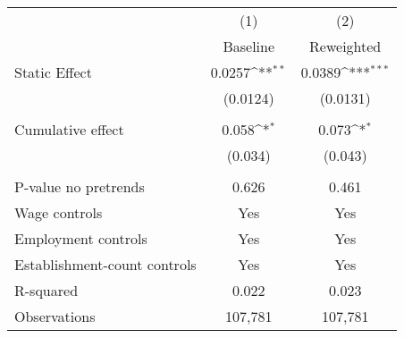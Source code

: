 {
\def\sym#1{\ifmmode^{#1}\else\(^{#1}\)\fi}
\begin{tabular}{l*{2}{c}}
\hline\hline
          &\multicolumn{1}{c}{(1)}&\multicolumn{1}{c}{(2)}\\
          &\multicolumn{1}{c}{Baseline}&\multicolumn{1}{c}{Reweighted}\\
\hline
Static Effect&   0.0257\sym{**} &   0.0389\sym{***}\\
          & (0.0124)         & (0.0131)         \\
\hline
\vspace{-1mm}&                  &                  \\
Cumulative effect&0.058\sym{*}         &0.073\sym{*}         \\
          &  (0.034)         &  (0.043)         \\
\hline    &                  &                  \\
P-value no pretrends&    0.626         &    0.461         \\
Wage controls&      Yes         &      Yes         \\
Employment controls&      Yes         &      Yes         \\
Establishment-count controls&      Yes         &      Yes         \\
R-squared &    0.022         &    0.023         \\
Observations&  107,781         &  107,781         \\
\hline\hline
\end{tabular}
}
